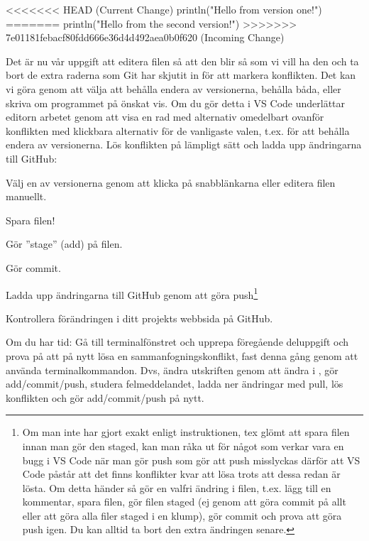 \begin{Datorarbete}
\begin{Code}
<<<<<<< HEAD (Current Change)
println("Hello from version one!")
=======
println("Hello from the second version!")
>>>>>>> 7e01181febacf80fdd666e36d4d492aea0b0f620 (Incoming Change)
\end{Code}

Det är nu vår uppgift att editera filen så att den blir så som vi vill ha den och ta bort de extra raderna som Git har skjutit in för att markera konflikten. Det kan vi göra genom att välja att behålla endera av versionerna, behålla båda, eller skriva om programmet på önskat vis. Om du gör detta i VS Code underlättar editorn arbetet genom att visa en rad med alternativ omedelbart ovanför konflikten med klickbara alternativ för de vanligaste valen, t.ex. för att behålla endera av versionerna. Lös konflikten på lämpligt sätt och ladda upp ändringarna till GitHub:

\begin{Deluppgifter}
\item Välj en av versionerna genom att klicka på snabblänkarna eller editera filen manuellt.
\item Spara filen!
\item Gör ''stage'' (add) på filen.
\item Gör commit.
\item Ladda upp ändringarna till GitHub genom att göra push\footnote{Om man inte har gjort exakt enligt instruktionen, tex glömt att spara filen innan man gör den staged, kan man råka ut för något som verkar vara en bugg i VS Code när man gör push som gör att push misslyckas därför att VS Code påstår att det finns konflikter kvar att lösa trots att dessa redan är lösta. Om detta händer så gör en valfri ändring i filen, t.ex. lägg till en kommentar, spara filen, gör filen staged (ej genom att göra commit på allt eller att göra alla filer staged i en klump), gör commit och prova att göra push igen. Du kan alltid ta bort den extra ändringen senare.}
\item Kontrollera förändringen i ditt projekts webbsida på GitHub.
\end{Deluppgifter}

\item Om du har tid: Gå till terminalfönstret och upprepa föregående deluppgift och prova på att på nytt lösa en sammanfogningskonflikt, fast denna gång genom att använda terminalkommandon. Dvs, ändra utskriften genom att ändra  i , gör add/commit/push, studera felmeddelandet, ladda ner ändringar med pull, lös konflikten och gör add/commit/push på nytt.


\end{Datorarbete}


